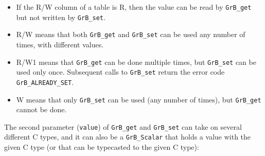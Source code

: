 \begin{itemize}
\item If the R/W column of a table is R, then the value can be read by \verb'GrB_get'
    but not written by \verb'GrB_set'.
\item R/W means that both \verb'GrB_get' and \verb'GrB_set' can be used any number of times,
    with different values.
\item R/W1 means that \verb'GrB_get' can be done multiple times,
    but \verb'GrB_set' can be used only once.
    Subsequent calls to \verb'GrB_set' return the error code \verb'GrB_ALREADY_SET'.
\item W means that only \verb'GrB_set' can be used (any number of times),
    but \verb'GrB_get' cannot be done.
\end{itemize}

The second parameter (\verb'value') of \verb'GrB_get' and \verb'GrB_set' can take on several
different C types, and it can also be a \verb'GrB_Scalar' that holds a value
with the given C type (or that can be typecasted to the given C type):

